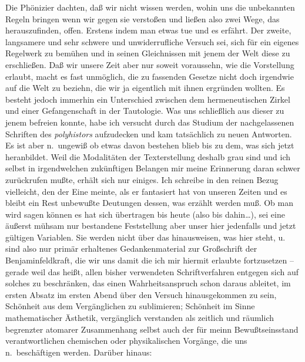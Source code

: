 \documentclass[
]{article}
\begin{document}
Die Phönizier dachten, daß wir nicht wissen werden, wohin uns die
unbekannten Regeln bringen wenn wir gegen sie verstoßen und ließen also
zwei Wege, das herauszufinden, offen. Erstens indem man etwas tue und es
erfährt. Der zweite, langsamere und sehr schwere und unwiderrufliche
Versuch sei, sich für ein eigenes Regelwerk zu bemühen und in seinen
Gleichnissen mit jenem der Welt diese zu erschließen. Daß wir unsere
Zeit aber nur soweit voraussehn, wie die Vorstellung erlaubt, macht es
fast unmöglich, die zu fassenden Gesetze nicht doch irgendwie auf die
Welt zu beziehn, die wir ja eigentlich mit ihnen ergründen wollten. Es
besteht jedoch immerhin ein Unterschied zwischen dem hermeneutischen
Zirkel und einer Gefangenschaft in der Tautologie. Was uns schließlich
aus dieser zu jenem befreien konnte, habe ich versucht durch das Studium
der nachgelassenen Schriften des \emph{polyhistors }aufzudecken und kam
tatsächlich zu neuen Antworten. Es ist aber n.~ungewiß ob etwas davon
bestehen blieb bis zu dem, was sich jetzt heranbildet. Weil die
Modalitäten der Texterstellung deshalb grau sind und ich selbst in
irgendwelchen zukünftigen Belangen mir meine Erinnerung daran schwer
zurückrufen mußte, erhält sich nur einiges. Ich schreibe in den reinen
Bezug vielleicht, den der Eine meinte, als er fantasiert hat von unseren
Zeiten und es bleibt ein Rest unbewußte Deutungen dessen, was erzählt
werden muß. Ob man wird sagen können es hat sich übertragen bis heute
(also bis dahin\ldots), sei eine äußerst mühsam nur bestandene
Feststellung aber unser hier jedenfalls und jetzt gültigen Variablen.
Sie werden nicht über das hinausweisen, was hier steht, u. sind also nur
primär erhaltenes Gedankenmaterial zur Großschrift der
Benjaminfeldkraft, die wir uns damit die ich mir hiermit erlaubte
fortzusetzen -- gerade weil das heißt, allen bisher verwendeten
Schriftverfahren entgegen sich auf solches zu beschränken, das einen
Wahrheitsanspruch schon daraus ableitet, im ersten Absatz im ersten
Abend über den Versuch hinausgekommen zu sein, Schönheit aus dem
Vergänglichen zu sublimieren; Schönheit im Sinne mathematischer
Ästhetik, vergänglich verstanden als zeitlich und räumlich begrenzter
atomarer Zusammenhang selbst auch der für meinn Bewußtseinsstand
verantwortlichen chemischen oder physikalischen Vorgänge, die uns
n.~beschäftigen werden. Darüber hinaus:
\end{document}
